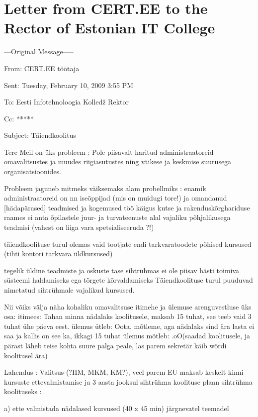 \chapter{Letter from CERT.EE to the Rector of Estonian IT College}
\label{Letter from CERT.EE to the Rector of Estonian IT College}
\begin{spacing}{1}
\small
---Original Message-----

From: CERT.EE töötaja\par
Sent: Tuesday, February 10, 2009 3:55 PM \par
To: Eesti Infotehnoloogia Kolledž Rektor \par
Cc: ***** \par
Subject: Täiendkoolitus\par

Tere
Meil on üks probleem  :
Pole piisavalt haritud administraatoreid omavalitsustes ja 
muudes riigiasutustes ning väikese ja keskmise suurusega organisatsioonides.

Probleem jaguneb mitmeks väiksemaks alam probellmiks :
enamik administraatoreid on nn iseõppijad (mis on muidugi tore!)
ja omandanud [hädapärased] teadmised ja kogemused töö käigus
kutse ja rakenduskõrghariduse raames ei anta õpilastele juur- ja
 turvateenuste alal vajaliku põhjalikusega teadmisi 
(vahest on liiga vara spetsialiseeruda ?!)

täiendkoolituse turul olemas vaid tootjate endi tarkvaratoodete põhised kursused 
(tihti kontori tarkvara üldkursused)

tegelik üldine teadmiste ja oskuste tase sihtrühmas 
ei ole piisav hästi toimiva süsteemi haldamiseks 
ega tõrgete kõrvaldamiseks
Täiendkoolituse turul puuduvad nimetatud sihtrühmale 
vajalikud kursused.

Nii võiks välja näha kohaliku omavalitsuse itimehe ja ülemuse arenguvestluse üks osa:
itimees: Tahan minna nädalaks koolitusele, maksab 15 tuhat, see teeb vaid 3 tuhat ühe päeva eest. ülemus ütleb: Oota, mõtleme, aga nädalaks sind ära lasta ei saa ja kallis on see ka, ikkagi 15 tuhat ülemus mõtleb: .oO(saadad koolitusele, ja pärast läheb teise kohta suure palga peale, las parem sekretär käib wördi koolitusel ära)

Lahendus :
Valitsus (?HM, MKM, KM?), veel parem EU maksab keskelt kinni kursuste ettevalmistamise ja 3 aasta jooksul sihtrühma koolituse plaan sihtrühma koolituseks :

a) ette valmistada nädalased kursused (40 x 45 min) järgnevatel teemadel


\end{spacing}
